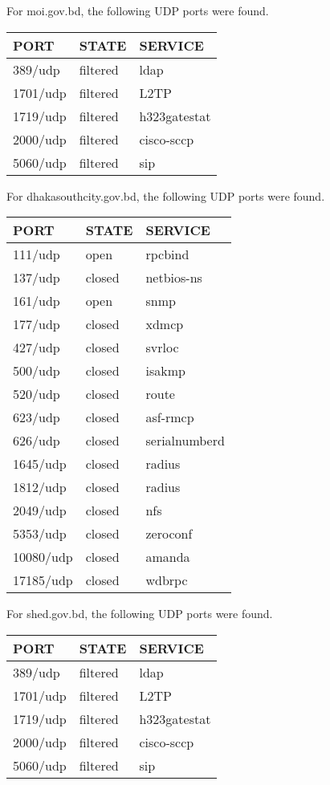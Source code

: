 \documentclass[11pt]{article}
\begin{document}
For moi.gov.bd, the following UDP ports were found.\\
\begin{center}
\begin{tabular}{lll}
PORT & STATE & SERVICE\\
\hline
389/udp & filtered & ldap\\
1701/udp & filtered & L2TP\\
1719/udp & filtered & h323gatestat\\
2000/udp & filtered & cisco-sccp\\
5060/udp & filtered & sip\\
\end{tabular}
\end{center}

For dhakasouthcity.gov.bd, the following UDP ports were found.\\
\begin{center}
\begin{tabular}{lll}
PORT & STATE & SERVICE\\
\hline
111/udp & open & rpcbind\\
137/udp & closed & netbios-ns\\
161/udp & open & snmp\\
177/udp & closed & xdmcp\\
427/udp & closed & svrloc\\
500/udp & closed & isakmp\\
520/udp & closed & route\\
623/udp & closed & asf-rmcp\\
626/udp & closed & serialnumberd\\
1645/udp & closed & radius\\
1812/udp & closed & radius\\
2049/udp & closed & nfs\\
5353/udp & closed & zeroconf\\
10080/udp & closed & amanda\\
17185/udp & closed & wdbrpc\\
\end{tabular}
\end{center}

For shed.gov.bd, the following UDP ports were found.\\
\begin{center}
\begin{tabular}{lll}
PORT & STATE & SERVICE\\
\hline
389/udp & filtered & ldap\\
1701/udp & filtered & L2TP\\
1719/udp & filtered & h323gatestat\\
2000/udp & filtered & cisco-sccp\\
5060/udp & filtered & sip\\
\end{tabular}
\end{center}
\end{document}
